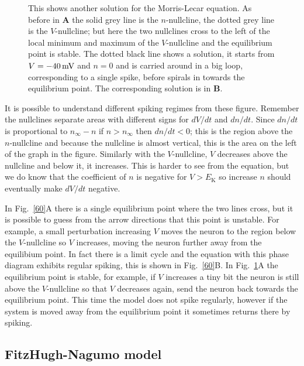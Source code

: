 \documentclass[12pt]{article}
\newcommand{\mV}{\mbox{\,mV}}
\begin{document}
\begin{figure}
\begin{center}

\end{center}
\caption{This shows another solution for the Morris-Lecar equation. As before in \textbf{A} the solid grey line is the
  $n$-nullcline, the dotted grey line is the $V$-nullcline; but here the two
  nullclines cross to the left of the local minimum and maximum of the
  $V$-nullcline and the equilibrium point is stable. The dotted
  black line shows a solution, it starts from $V=-40\mV$ and $n=0$ and
  is carried around in a big loop, corresponding to a single spike, before spirals in towards the equilibrium point. The corresponding solution is in
  \textbf{B}.  \label{40}}
\end{figure}


It is possible to understand different spiking regimes from these
figure. Remember the nullclines separate areas with different signs
for $dV/dt$ and $dn/dt$. Since $dn/dt$ is proportional to $n_\infty-n$
if $n>n_\infty$ then $dn/dt<0$; this is the region above the
$n$-nullcline and because the nullcline is almost vertical, this is
the area on the left of the graph in the figure. Similarly with the
$V$-nullcline, $V$ decreases above the nullcline and below it, it
increases. This is harder to see from the equation, but we do know
that the coefficient of $n$ is negative for $V>E_{\text{K}}$ so increase $n$
should eventually make $dV/dt$ negative.

In Fig.~\ref{60}A there is a single equilibrium point where the two
lines cross, but it is possible to guess from the arrow directions
that this point is unstable. For example, a small perturbation
increasing $V$ moves the neuron to the region below the $V$-nullcline
so $V$ increases, moving the neuron further away from the equilibium
point. In fact there is a limit cycle and the equation with this phase
diagram exhibits regular spiking, this is shown in Fig.~\ref{60}B. In
Fig.~\ref{40}A the equilibrium point is stable, for example, if $V$
increases a tiny bit the neuron is still above the $V$-nullcline so
that $V$ decreases again, send the neuron back towards the equilibrium
point. This time the model does not spike regularly, however if the
system is moved away from the equilibrium point it sometimes returns
there by spiking.

\subsection*{FitzHugh-Nagumo model}
\end{document}
